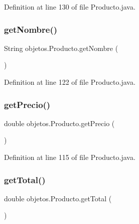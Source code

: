 Definition at line 130 of file Producto.\+java.

\mbox{\label{classobjetos_1_1_producto_a57f2351473e89e49d44441154f6110ed}} 
\subsubsection{\texorpdfstring{get\+Nombre()}{getNombre()}}
{\footnotesize\ttfamily String objetos.\+Producto.\+get\+Nombre (\begin{DoxyParamCaption}{ }\end{DoxyParamCaption})}



Definition at line 122 of file Producto.\+java.

\mbox{\label{classobjetos_1_1_producto_aa4b79134d6f59058f663c5e241bd6389}} 
\subsubsection{\texorpdfstring{get\+Precio()}{getPrecio()}}
{\footnotesize\ttfamily double objetos.\+Producto.\+get\+Precio (\begin{DoxyParamCaption}{ }\end{DoxyParamCaption})}



Definition at line 115 of file Producto.\+java.

\mbox{\label{classobjetos_1_1_producto_adbea45187ac465c2a7a2993f4739cb40}} 
\subsubsection{\texorpdfstring{get\+Total()}{getTotal()}}
{\footnotesize\ttfamily double objetos.\+Producto.\+get\+Total (\begin{DoxyParamCaption}{ }\end{DoxyParamCaption})}



